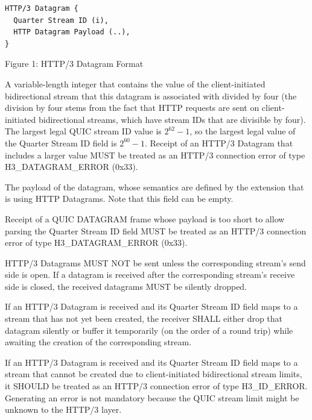 \documentclass{article}
\begin{document}
\begin{verbatim}
HTTP/3 Datagram {
  Quarter Stream ID (i),
  HTTP Datagram Payload (..),
}
\end{verbatim}

\begin{center}
Figure 1: HTTP/3 Datagram Format
\end{center}

\begin{description}[style=unboxed, leftmargin=0.5cm]
\item[Quarter Stream ID:]  A variable-length integer that contains the value
   of the client-initiated bidirectional stream that this datagram is
   associated with divided by four (the division by four stems from
   the fact that HTTP requests are sent on client-initiated
   bidirectional streams, which have stream IDs that are divisible by
   four).  The largest legal QUIC stream ID value is $2^{62}-1$, so the
   largest legal value of the Quarter Stream ID field is $2^{60}-1$.
   Receipt of an HTTP/3 Datagram that includes a larger value MUST be
   treated as an HTTP/3 connection error of type H3\_DATAGRAM\_ERROR
   (0x33).

\item[HTTP Datagram Payload:]  The payload of the datagram, whose semantics
   are defined by the extension that is using HTTP Datagrams.  Note
   that this field can be empty.
\end{description}

Receipt of a QUIC DATAGRAM frame whose payload is too short to allow
parsing the Quarter Stream ID field MUST be treated as an HTTP/3
connection error of type H3\_DATAGRAM\_ERROR (0x33).

HTTP/3 Datagrams MUST NOT be sent unless the corresponding stream's
send side is open.  If a datagram is received after the corresponding
stream's receive side is closed, the received datagrams MUST be
silently dropped.

If an HTTP/3 Datagram is received and its Quarter Stream ID field
maps to a stream that has not yet been created, the receiver SHALL
either drop that datagram silently or buffer it temporarily (on the
order of a round trip) while awaiting the creation of the
corresponding stream.

If an HTTP/3 Datagram is received and its Quarter Stream ID field
maps to a stream that cannot be created due to client-initiated
bidirectional stream limits, it SHOULD be treated as an HTTP/3
connection error of type H3\_ID\_ERROR.  Generating an error is not
mandatory because the QUIC stream limit might be unknown to the
HTTP/3 layer.
\end{document}
